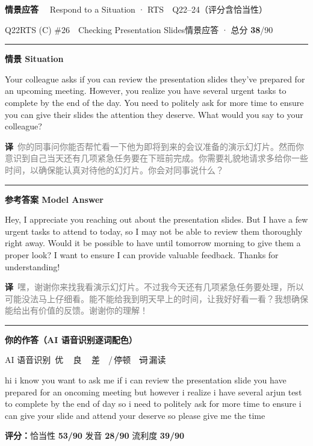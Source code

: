 \documentclass[11pt]{article}
\newcommand{\spart}[1]{\textcolor{cPartial}{\bfseries #1}} %
\newcommand{\ptesub}[1]{%
  \par\needspace{2\baselineskip}\smallskip
  {\color{cAccent}\rule[-0.2ex]{3pt}{1.05em}}\hspace{6pt}%
  {\bfseries\color{cHead}#1}\par\nopagebreak\smallskip}
\newcommand{\ptetask}[2]{%
  \addcontentsline{toc}{subsection}{#1\ #2}%
  \needspace{4\baselineskip}\medskip
  \begin{tcolorbox}[enhanced, colback=cHead, colframe=cHead, sharp corners,
     left=12pt, right=12pt, top=5pt, bottom=5pt, boxrule=0pt]
    {\large\bfseries\color{white} #1}\ \ {\color{white!80} #2}
  \end{tcolorbox}\smallskip}
\newcommand{\sg}[1]{\textcolor{cSpkGood}{#1}}   %
\newcommand{\sy}[1]{\textcolor{cSpkOk}{#1}}     %
\newcommand{\sr}[1]{\textcolor{cSpkBad}{#1}}    %
\newcommand{\asrlegend}{{\footnotesize\color{gray}AI 语音识别\quad
  {\color{cSpkGood}\textbullet}\,优\ \ {\color{cSpkOk}\textbullet}\,良\ \
  {\color{cSpkBad}\textbullet}\,差\ \ {\color{gray}/}\,停顿\ \
  {\color{cSpkBad}\sout{词}}\,漏读}}
\newcommand{\zh}[1]{{\footnotesize\textcolor{cNote}{\textbf{译}}\ \textcolor{gray}{#1}}}
\begin{document}
\ptetask{情景应答}{Respond to a Situation · RTS　Q22--24（评分含恰当性）}
\begin{qblock}{Q22\quad RTS (C) \#26\ \ Checking Presentation Slides}{情景应答 · 总分 \textcolor{cAccent}{\bfseries 38}/90}
\ptesub{情景 Situation}
\begin{promptbox}
Your colleague asks if you can review the presentation slides they've prepared for an upcoming meeting. However, you realize you have several urgent tasks to complete by the end of the day. You need to politely ask for more time to ensure you can give their slides the attention they deserve. What would you say to your colleague?
\end{promptbox}
\zh{你的同事问你能否帮忙看一下他为即将到来的会议准备的演示幻灯片。然而你意识到自己当天还有几项紧急任务要在下班前完成。你需要礼貌地请求多给你一些时间，以确保能认真对待他的幻灯片。你会对同事说什么？}
\ptesub{参考答案 Model Answer}
\begin{modelbox}
Hey, I appreciate you reaching out about the presentation slides. But I have a few urgent tasks to attend to today, so I may not be able to review them thoroughly right away. Would it be possible to have until tomorrow morning to give them a proper look? I want to ensure I can provide valuable feedback. Thanks for understanding!
\end{modelbox}
\zh{嘿，谢谢你来找我看演示幻灯片。不过我今天还有几项紧急任务要处理，所以可能没法马上仔细看。能不能给我到明天早上的时间，让我好好看一看？我想确保能给出有价值的反馈。谢谢你的理解！}
\ptesub{你的作答（AI 语音识别逐词配色）}
\asrlegend
\begin{asrbox}
\sy{hi} \sg{i} \sg{know} \sg{you} \sg{want} \sg{to} \sg{ask} \sg{me} \sg{if} \sg{i} \sg{can} \sg{review} \sg{the} \sg{presentation} \sg{slide} \sg{you} \sg{have} \sy{prepared} \sg{for} \sg{an} \sy{oncoming} \sg{meeting} \sg{but} \sg{however} \sg{i} \sg{realize} \sg{i} \sg{have} \sg{several} \sr{arjun} \sg{test} \sg{to} \sg{complete} \sg{by} \sy{the} \sg{end} \sg{of} \sg{day} \sg{so} \sg{i} \sg{need} \sy{to} \sg{politely} \sg{ask} \sg{for} \sg{more} \sg{time} \sg{to} \sg{ensure} \sg{i} \sg{can} \sg{give} \sg{your} \sg{slide} \sg{and} \sy{attend} \sg{your} \sg{deserve} \sg{so} \sg{please} \sg{give} \sg{me} \sg{the} \sg{time}
\end{asrbox}
\smallskip
{\small\textbf{评分：}恰当性 \spart{53/90} \quad\textperiodcentered\quad 发音 \spart{28/90} \quad\textperiodcentered\quad 流利度 \spart{39/90}}
\end{qblock}
\end{document}
